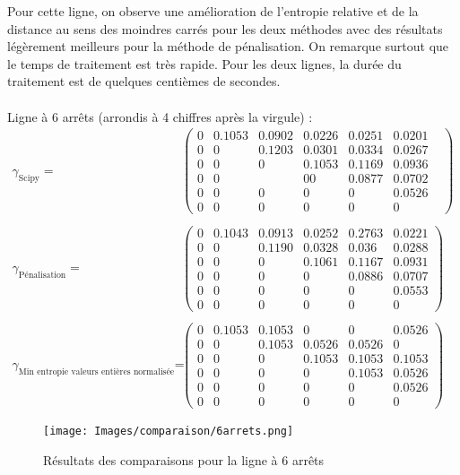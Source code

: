 \documentclass[12pt]{article}
\begin{document}
Pour cette ligne, on observe une amélioration de l'entropie relative et de la distance au sens des moindres carrés pour les deux méthodes avec des résultats légèrement meilleurs pour la méthode de pénalisation. On remarque surtout que le temps de traitement est très rapide. Pour les deux lignes, la durée du traitement est de quelques centièmes de secondes.\\
\\
Ligne à 6 arrêts (arrondis à 4 chiffres après la virgule) :\\
\[
\begin{split}
\gamma_{\text{Scipy}} = &
\begin{pmatrix}
0 & 0.1053 & 0.0902 & 0.0226 &0.0251& 0.0201\\
0 & 0 & 0.1203 & 0.0301 & 0.0334 & 0.0267\\
0 & 0 & 0 & 0.1053 & 0.1169 & 0.0936 &\\
0 & 0 & & 0 0 & 0.0877 & 0.0702 & \\
0 & 0 & 0 & 0 & 0& 0.0526 &\\
0 & 0 & 0 & 0 & 0 & 0
\end{pmatrix}\\
\\
\gamma_{\text{Pénalisation}} = &
\begin{pmatrix}
0 & 0.1043 & 0.0913 & 0.0252 & 0.2763 & 0.0221\\
0 & 0 & 0.1190  & 0.0328  & 0.036 & 0.0288  \\
0 & 0 & 0 & 0.1061  & 0.1167 & 0.0931 \\
0 & 0 & 0 & 0 & 0.0886 & 0.0707\\
0 & 0 & 0 & 0 & 0 & 0.0553\\
0 & 0 & 0 & 0 & 0 & 0
\end{pmatrix}\\
\\
\gamma_{\text{Min entropie valeurs entières normalisée}} = &
\begin{pmatrix}
0 & 0.1053 &  0.1053  & 0 & 0 & 0.0526\\
0 & 0 &  0.1053 &  0.0526  &  0.0526 & 0\\
0 & 0 & 0 &  0.1053   &  0.1053  &  0.1053\\
0 & 0 & 0 & 0 &  0.1053 &  0.0526\\
0 & 0 & 0 & 0 & 0 &  0.0526\\
0 & 0 & 0 & 0 & 0 & 0
\end{pmatrix}
\end{split}
\]
\vspace{0.3cm}
\begin{figure}[H]
    \centering
    \texttt{[image: Images/comparaison/6arrets.png]}
    \caption{Résultats des comparaisons pour la ligne à 6 arrêts}
\end{figure}
\end{document}
